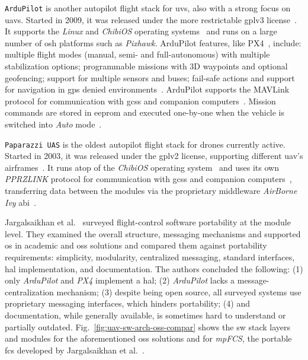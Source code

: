 %
\lstinline{ArduPilot} is another autopilot flight stack for \glspl{uv}, also with a strong focus
on \glspl{uav}. Started in 2009, it was released under the more restrictable
\gls{gpl}v3 license~\cite{arduPilotHistory}. It supports the \emph{Linux} and
\emph{ChibiOS} operating
systems~\cite{arduPilot-github,jargalsaikhan2022architectural} and runs on a large number of
\gls{osh} platforms such as \emph{Pixhawk}.
%
ArduPilot features, like PX4~\cite{px4-features}, include:
multiple flight modes (manual, semi- and full-autonomous) with multiple
stabilization options; programmable missions with 3D waypoints and optional
geofencing; support for multiple sensors and buses; fail-safe actions and
support for navigation in \gls{gps} denied environments~\cite{arduPilot-home}.
%
ArduPilot supports the MAVLink protocol for communication with
\glspl{gcs} and companion computers~\cite{arduPilot-home}. Mission commands are
stored in \gls{eeprom} and executed one-by-one when the vehicle is switched into
\emph{Auto} mode~\cite{ardupilot-mavlink}.

%
\lstinline{Paparazzi UAS} is the oldest autopilot flight stack for drones
currently active. Started in 2003, it was released under the \gls{gpl}v2
license, supporting different \gls{uav}'s airframes~\cite{paparazzi-home}.
It runs atop of the \emph{ChibiOS} operating
system~\cite{paparazzi-sysOverv} and uses its own \emph{PPRZLINK} protocol for communication
with \glspl{gcs} and companion computers~\cite{paparazzi-sysOverv}, transferring
data between the modules via the proprietary middleware \emph{AirBorne Ivy} \gls{abi}~\cite{jargalsaikhan2022architectural}.

Jargalsaikhan et al.~\cite{jargalsaikhan2022architectural} surveyed
flight-control software portability at the module level. They examined the
overall structure, messaging mechanisms and supported \gls{os} in academic and \gls{oss} solutions and compared them against portability requirements:
simplicity, modularity, centralized messaging, standard interfaces, \gls{hal}
implementation, and documentation. The authors concluded the following: (1) only
\emph{ArduPilot} and \emph{PX4} implement a \gls{hal}; (2) \emph{ArduPilot}
lacks a message-centralization mechanism; (3) despite being open source, all
surveyed systems use proprietary messaging interfaces, which hinders
portability; (4) and documentation, while generally available, is sometimes hard
to understand or partially outdated. Fig.~\ref{fig:uav-sw-arch-oss-compar} shows the \gls{sw}
stack layers and modules for the aforementioned \gls{oss} solutions and for
\emph{mpFCS}, the portable \gls{fcs} developed by Jargalsaikhan et
al.~\cite{jargalsaikhan2022architectural}.


